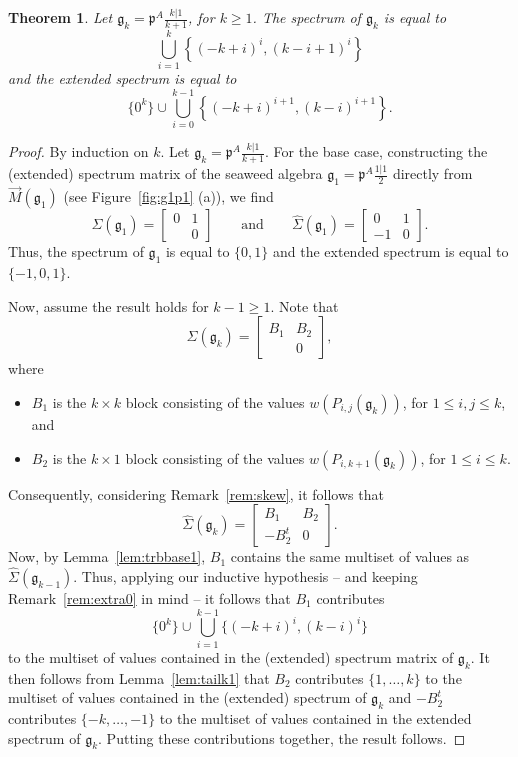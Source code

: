 \documentclass[letterpaper,10pt]{article}
\newtheorem{theorem}{Theorem}
\begin{document}
\begin{theorem}\label{thm:base1}
Let $\mathfrak{g}_k=\mathfrak{p}^A\frac{k|1}{k+1}$, for $k\ge 1$. The spectrum of $\mathfrak{g}_k$ is equal to
$$\bigcup_{i=1}^k\left\{(-k+i)^i,(k-i+1)^i\right\}$$ and the extended spectrum is equal to $$\{0^k\}\cup\bigcup_{i=0}^{k-1}\left\{(-k+i)^{i+1},(k-i)^{i+1}\right\}.$$
\end{theorem}
\begin{proof}
By induction on $k.$ Let $\mathfrak{g}_k=\mathfrak{p}^A\frac{k|1}{k+1}$. For the base case, constructing the (extended) spectrum matrix of the seaweed algebra $\mathfrak{g}_1=\mathfrak{p}^A\frac{1|1}{2}$ directly from $\overrightarrow{M}(\mathfrak{g}_1)$ (see Figure~\ref{fig:g1p1} (a)), we find $$\Sigma(\mathfrak{g}_1)=\begin{bmatrix}
0 & 1\\
 & 0
\end{bmatrix}\quad\quad\text{and}\quad\quad \widehat{\Sigma}(\mathfrak{g}_1)=\begin{bmatrix}
0 & 1\\
-1 & 0
\end{bmatrix}.$$ Thus, the spectrum of $\mathfrak{g}_1$ is equal to $\{0,1\}$ and the extended spectrum is equal to $\{-1,0,1\}$.

Now, assume the result holds for $k-1\ge 1$. Note that $$\Sigma(\mathfrak{g}_k)=\begin{bmatrix} B_1 & B_2 \\  & 0 \end{bmatrix},$$ where
\begin{itemize}
    \item $B_1$ is the $k\times k$ block consisting of the values $w(P_{i,j}(\mathfrak{g}_k))$, for $1\le i,j\le k$, and
    \item $B_2$ is the $k\times 1$ block consisting of the values $w(P_{i,k+1}(\mathfrak{g}_k))$, for $1\le i\le k$.
\end{itemize}
Consequently, considering Remark~\ref{rem:skew}, it follows that $$\widehat{\Sigma}(\mathfrak{g}_k)=\begin{bmatrix} B_1 & B_2 \\ -B_2^t & 0 \end{bmatrix}.$$ Now, by Lemma~\ref{lem:trbbase1}, $B_1$ contains the same multiset of values as $\widehat{\Sigma}(\mathfrak{g}_{k-1})$. Thus, applying our inductive hypothesis -- and keeping Remark~\ref{rem:extra0} in mind -- it follows that $B_1$ contributes $$\{0^k\}\cup\bigcup_{i=1}^{k-1}\{(-k+i)^i,(k-i)^i\}$$ to the multiset of values contained in the (extended) spectrum matrix of $\mathfrak{g}_k$. It then follows from Lemma~\ref{lem:tailk1} that $B_2$ contributes $\{1,\hdots,k\}$ to the multiset of values contained in the (extended) spectrum of $\mathfrak{g}_k$ and $-B_2^t$ contributes $\{-k,\hdots,-1\}$ to the multiset of values contained in the extended spectrum of $\mathfrak{g}_k$. Putting these contributions together, the result follows.
\end{proof}
\end{document}
